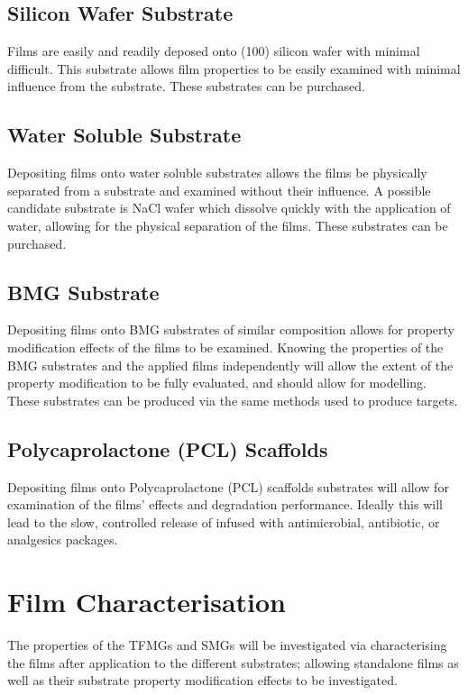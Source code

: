 \documentclass[draft,a4paper,12pt,oneside]{report}%
\begin{document}
\subsection{Silicon Wafer Substrate}
Films are easily and readily deposed onto (100) silicon wafer with minimal difficult. This substrate allows film properties to be easily examined with minimal influence from the substrate. These substrates can be purchased. 

\subsection{Water Soluble Substrate} 
Depositing films onto water soluble substrates allows the films be physically separated from a substrate and examined without their influence. A possible candidate substrate is NaCl wafer which dissolve quickly with the application of water, allowing for the physical separation of the films. These substrates can be purchased. 

\subsection{BMG Substrate}
Depositing films onto BMG substrates of similar composition allows for property modification effects of the films to be examined. Knowing the properties of the BMG substrates and the applied films independently will allow the extent of the property modification to be fully evaluated, and should allow for modelling. These substrates can be produced via the same methods  used to produce targets. 

\subsection{Polycaprolactone (PCL) Scaffolds}
Depositing films onto Polycaprolactone (PCL) scaffolds substrates will allow for examination of the films' effects and degradation performance. Ideally this will lead to the slow, controlled release of infused with antimicrobial, antibiotic, or analgesics packages.

\section{Film Characterisation}
The properties of the TFMGs and SMGs will be investigated via characterising the films after application to the different substrates; allowing standalone films as well as their substrate property modification effects to be investigated. 
\end{document}
